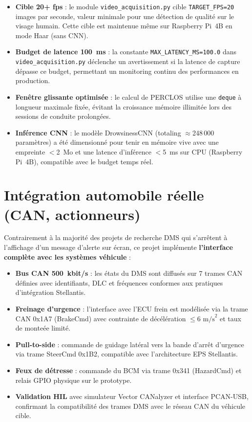 \documentclass[12pt,a4paper]{report}
\begin{document}
\begin{itemize}
  \item \textbf{Cible 20+ fps} : le module \texttt{video\_acquisition.py} cible \texttt{TARGET\_FPS=20} images par seconde, valeur minimale pour une d\'etection de qualit\'e sur le visage humain. Cette cible est maintenue m\^eme sur Raspberry Pi~4B en mode Haar (sans CNN).
  \item \textbf{Budget de latence 100~ms} : la constante \texttt{MAX\_LATENCY\_MS=100.0} dans \texttt{video\_acquisition.py} d\'eclenche un avertissement si la latence de capture d\'epasse ce budget, permettant un monitoring continu des performances en production.
  \item \textbf{Fen\^etre glissante optimis\'ee} : le calcul de PERCLOS utilise une \texttt{deque} \`a longueur maximale fix\'ee, \'evitant la croissance m\'emoire illimit\'ee lors des sessions de conduite prolong\'ees.
  \item \textbf{Inf\'erence CNN} : le mod\`ele DrowsinessCNN (totaling $\approx$248\,000 param\`etres) a \'et\'e dimensionn\'e pour tenir en m\'emoire vive avec une empreinte $<$2~Mo et une latence d'inf\'erence $<$5~ms sur CPU (Raspberry Pi~4B), compatible avec le budget temps r\'eel.
\end{itemize}

\section{Int\'egration automobile r\'eelle (CAN, actionneurs)}

Contrairement \`a la majorit\'e des projets de recherche DMS qui s'arr\^etent \`a l'affichage d'un message d'alerte sur \'ecran, ce projet impl\'emente \textbf{l'interface compl\`ete avec les syst\`emes v\'ehicule} :

\begin{itemize}
  \item \textbf{Bus CAN 500~kbit/s} : les \'etats du DMS sont diffus\'es sur 7 trames CAN d\'efinies avec identifiants, DLC et fr\'equences conformes aux pratiques d'int\'egration Stellantis.
  \item \textbf{Freinage d'urgence} : l'interface avec l'ECU frein est mod\'elis\'ee via la trame CAN 0x1A7 (BrakeCmd) avec contrainte de d\'ec\'el\'eration $\leq 6\text{ m/s}^2$ et taux de monte\'ee limit\'e.
  \item \textbf{Pull-to-side} : commande de guidage lat\'eral vers la bande d'arr\^et d'urgence via trame SteerCmd 0x1B2, compatible avec l'architecture EPS Stellantis.
  \item \textbf{Feux de d\'etresse} : commande du BCM via trame 0x341 (HazardCmd) et relais GPIO physique sur le prototype.
  \item \textbf{Validation HIL} avec simulateur Vector CANalyzer et interface PCAN-USB, confirmant la compatibilit\'e des trames DMS avec le r\'eseau CAN du v\'ehicule cible.
\end{itemize}
\end{document}
